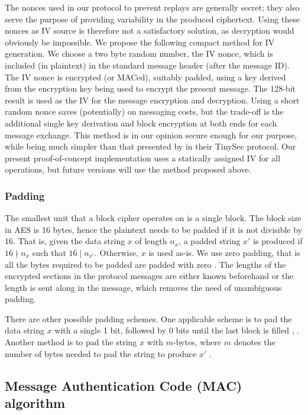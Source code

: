 The nonces used in our protocol to prevent replays are generally secret; they also serve the purpose of providing variability in the produced ciphertext. Using these nonces as IV source is therefore not a satisfactory solution, as decryption would obviously be impossible. 
%
We propose the following compact method for IV generation. We choose a two byte random number, the IV nonce, which is included (in plaintext) in the standard message header (after the message ID). The IV nonce is encrypted (or MACed), suitably padded, using a key derived from the encryption key being used to encrypt the present message. The 128-bit result is used as the IV for the message encryption and decryption. Using a short random nonce saves (potentially) on messaging costs, but the trade-off is the additional single key derivation and block encryption at both ends for each message exchange.
%
This method is in our opinion secure enough for our purpose, while being much simpler than that presented by  in their TinySec protocol. Our present proof-of-concept implementation uses a statically assigned IV for all operations, but future versions will use the method proposed above.

\subsubsection{Padding}

The smallest unit that a block cipher operates on is a single block. The block size in AES is 16 bytes, hence the plaintext needs to be padded if it is not divisible by 16. That is, given the data string $x$ of length $n_x$, a padded string $x'$ is produced if $16 \nmid n_x$ such that $16 \mid n_{x'}$. Otherwise, $x$ is used as-is. We use zero padding, that is all the bytes required to be padded are padded with zero \cite[Algorithm 9.29]{menezes1996}. The lengths of the encrypted sections in the protocol messages are either known beforehand or the length is sent along in the message, which removes the need of unambiguous padding.

There are other possible padding schemes. One applicable scheme is to pad the data string $x$ with a single 1 bit, followed by 0 bits until the last block is filled \cite[Algorithm 9.30]{menezes1996}, \cite[Appendix A]{dworkin2001}. Another method is to pad the string $x$ with $m$-bytes, where $m$ denotes the number of bytes needed to pad the string to produce $x'$ \cite{RFC-2315-kaliski-1998}.

\subsection{Message Authentication Code (MAC) algorithm}

